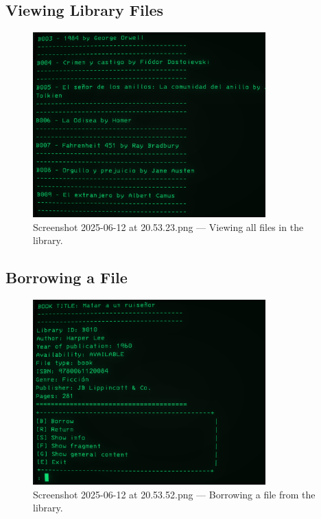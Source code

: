 \documentclass[a4paper,12pt]{article}
\begin{document}
\subsection{Viewing Library Files}
\begin{figure}[ht!]
    \centering
    \includegraphics[width=0.8\textwidth]{Screenshot 2025-06-12 at 20.53.23.png}
    \caption{Screenshot 2025-06-12 at 20.53.23.png --- Viewing all files in the library.}
\end{figure}

\subsection{Borrowing a File}
\begin{figure}[ht!]
    \centering
    \includegraphics[width=0.8\textwidth]{Screenshot 2025-06-12 at 20.53.52.png}
    \caption{Screenshot 2025-06-12 at 20.53.52.png --- Borrowing a file from the library.}
\end{figure}
\end{document}
